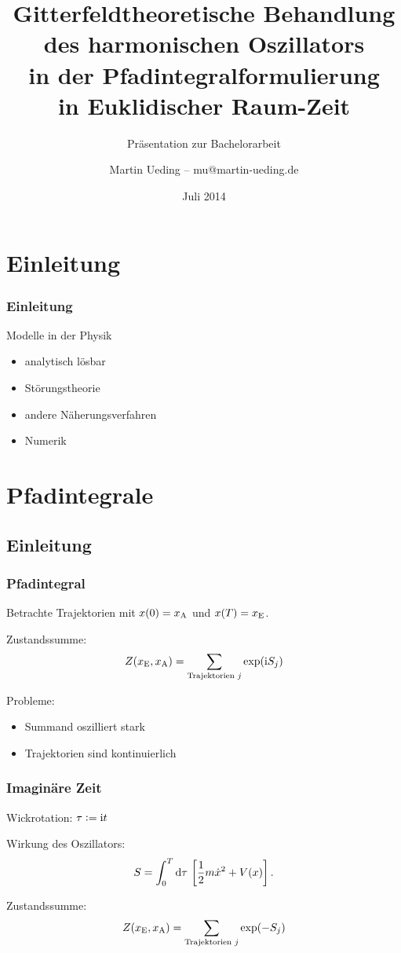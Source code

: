\documentclass[ngerman, fleqn]{beamer}
\title{%
    Gitterfeldtheoretische Behandlung\\
    des harmonischen Oszillators\\
    in der Pfadintegralformulierung\\
    in Euklidischer Raum-Zeit
}
\subtitle{Präsentation zur Bachelorarbeit}
\author{Martin Ueding – mu@martin-ueding.de}
\date{Juli 2014}
\renewcommand\iup{\text i}
\begin{document}
\begin{frame}
    \titlepage
\end{frame}

\section*{Einleitung}

\begin{frame}
    \frametitle{Einleitung}

    Modelle in der Physik

    \begin{itemize}
        \item
            analytisch lösbar
        \item
            Störungstheorie
        \item
            andere Näherungsverfahren
        \item
            Numerik
    \end{itemize}
\end{frame}

\begin{frame}
    \tableofcontents
\end{frame}

\section{Pfadintegrale}

\frame\sectionpage

\subsection{Einleitung}

\begin{frame}
    \frametitle{Pfadintegral}

    Betrachte Trajektorien mit $x(0) = x_\text A$ und $x(T) = x_\text E$.

    Zustandssumme:
    \[
        Z(x_\text E, x_\text A) = \sum_{\text{Trajektorien $j$}} \exp(\iup S_j)
    \]

    Probleme:
    \begin{itemize}
        \item Summand oszilliert stark
        \item Trajektorien sind kontinuierlich
    \end{itemize}
\end{frame}

\begin{frame}
    \frametitle{Imaginäre Zeit}

    Wickrotation: $\tau := \iup t$

    Wirkung des Oszillators:
    \[
        S = \int_0^T \dif \tau \, \sbr{\frac 12 m \dot x^2 + V(x)}.
    \]

    Zustandssumme:
    \[
        Z(x_\text E, x_\text A) = \sum_{\text{Trajektorien $j$}} \exp(- S_j)
    \]
\end{frame}
\end{document}
